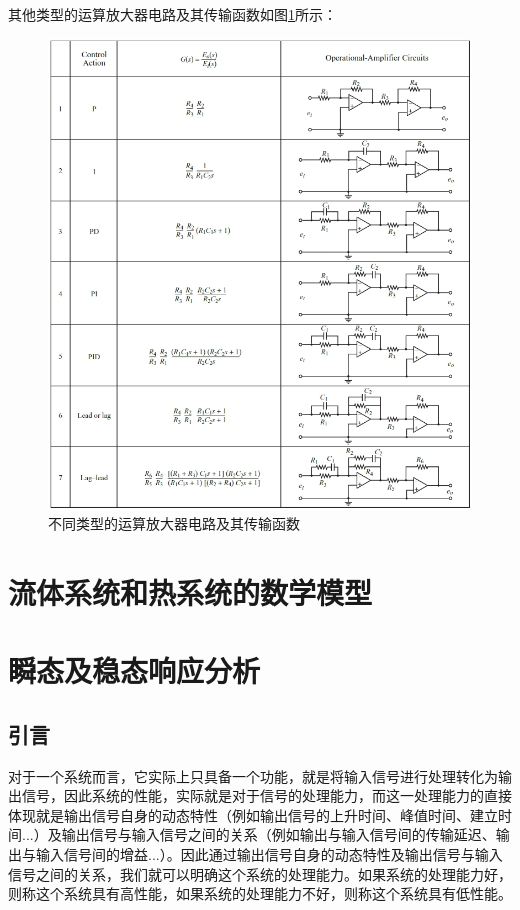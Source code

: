 \documentclass{article}
\numberwithin{equation}{section}
\numberwithin{figure}{section}
\begin{document}
其他类型的运算放大器电路及其传输函数如图\ref{circuittable3-1}所示：
\begin{figure}
    \centering
    \includegraphics[width=1\textwidth]{Chapter3/table.png} %
    \caption{不同类型的运算放大器电路及其传输函数} %
    \label{circuittable3-1} %
\end{figure}

\section{流体系统和热系统的数学模型}

\section{瞬态及稳态响应分析}
\subsection{引言}

对于一个系统而言，它实际上只具备一个功能，就是将输入信号进行处理转化为输出信号，因此系统的性能，实际就是对于信号的处理能力，而这一处理能力的直接体现就是输出信号自身的动态特性（例如输出信号的上升时间、峰值时间、建立时间...）及输出信号与输入信号之间的关系（例如输出与输入信号间的传输延迟、输出与输入信号间的增益...）。因此通过输出信号自身的动态特性及输出信号与输入信号之间的关系，我们就可以明确这个系统的处理能力。如果系统的处理能力好，则称这个系统具有高性能，如果系统的处理能力不好，则称这个系统具有低性能。
\end{document}

